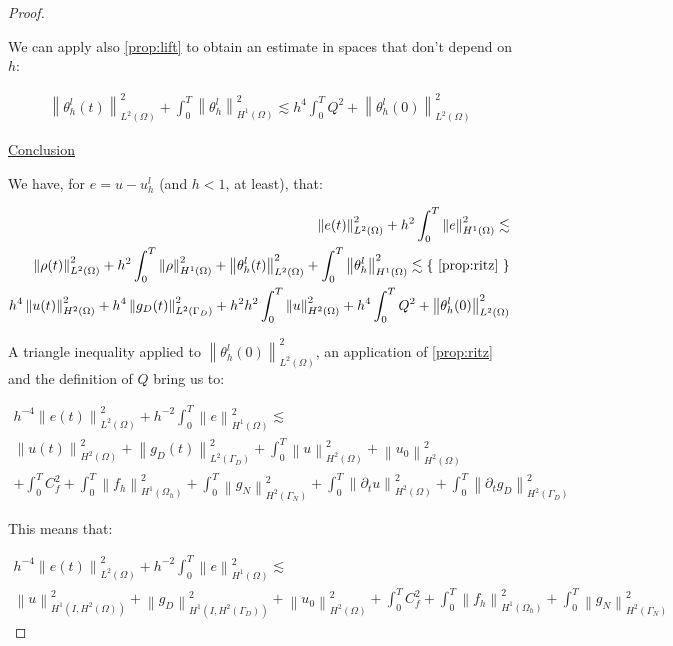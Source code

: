 \documentclass[english,a4paper,9pt,oneside]{scrbook}	%
\theoremstyle{break}
\newenvironment{mproof}[1][\proofname]{%
  \begin{proof}[#1]$ $\par\nobreak\ignorespaces
}{%
  \end{proof}
}
\renewcommand*{\proofname}{Proof}
\theoremstyle{remark}
\newcommand{\norm}[1]{\left\lVert#1\right\rVert}
\newcommand{\ind}[1]{\{\text{ #1 }\}}
\begin{document}
\begin{appendices}
\begin{mproof}
We can apply also \cref{prop:lift} to obtain an estimate in spaces that don't depend on $h$:


\begin{align*}
	\norm{\theta_h^l(t)}_{L^2(\Omega)}^2 + \int_0^T\norm{\theta_h^l}^2_{H^1(\Omega)} \lesssim h^4\int_0^T Q^2 + \norm{\theta_h^l(0)}_{L^2(\Omega)}^2
\end{align*}

\underline{Conclusion}

We have, for $e=u-u_h^l$ (and $h<1$, at least), that:

\begin{align*}
	\norm{e(t)}_{L^2(\Omega)}^2 + h^2\int_0^T\norm{e}^2_{H^1(\Omega)} \lesssim\\
	\norm{\rho(t)}_{L^2(\Omega)}^2 + h^2\int_0^T\norm{\rho}^2_{H^1(\Omega)} 	+ \norm{\theta_h^l(t)}_{L^2(\Omega)}^2 + \int_0^T\norm{\theta_h^l}^2_{H^1(\Omega)} \lesssim \ind{\cref{prop:ritz}} \\
	 h^4 \norm{u(t)}_{H^2(\Omega)}^2 + h^4\norm{g_D(t)}_{L^2(\Gamma_D)}^2 + h^2h^2\int_0^T\norm{u}^2_{H^2(\Omega)} +  h^4\int_0^T Q^2 + \norm{\theta_h^l(0)}_{L^2(\Omega)}^2
\end{align*}

A triangle inequality applied to $\norm{\theta_h^l(0)}_{L^2(\Omega)}^2$, an application of \cref{prop:ritz} and the definition of $Q$ bring us to:


\begin{align*}
	 h^{-4}\norm{e(t)}_{L^2(\Omega)}^2 + h^{-2}\int_0^T\norm{e}^2_{H^1(\Omega)} \lesssim\\
	  \norm{u(t)}_{H^2(\Omega)}^2 + \norm{g_D(t)}_{L^2(\Gamma_D)}^2 + \int_0^T\norm{u}^2_{H^2(\Omega)} + \norm{u_0}_{H^2(\Omega)}^2 \\
	 +  \int_0^T C_f^2 + \int_0^T \norm{f_h}_{H^1(\Omega_h)}^2+  \int_0^T  \norm{g_N}_{H^2(\Gamma_N)}^2 +\int_0^T \norm{\partial_t u}_{H^2(\Omega)}^2 + \int_0^T\norm{ \partial_t g_D}_{H^2(\Gamma_D)}^2
\end{align*}

This means that:

\begin{align*}
	 h^{-4}\norm{e(t)}_{L^2(\Omega)}^2 + h^{-2}\int_0^T\norm{e}^2_{H^1(\Omega)} \lesssim\\
	 \norm{u}_{H^1(I,H^2(\Omega))}^2 + \norm{g_D}_{H^1(I,H^2(\Gamma_D))}^2 + \norm{u_0}_{H^2(\Omega)}^2 +  \int_0^T C_f^2+ \int_0^T \norm{f_h}_{H^1(\Omega_h)}^2 +  \int_0^T  \norm{g_N}_{H^2(\Gamma_N)}^2
\end{align*}


\end{mproof}
\end{appendices}
\end{document}
